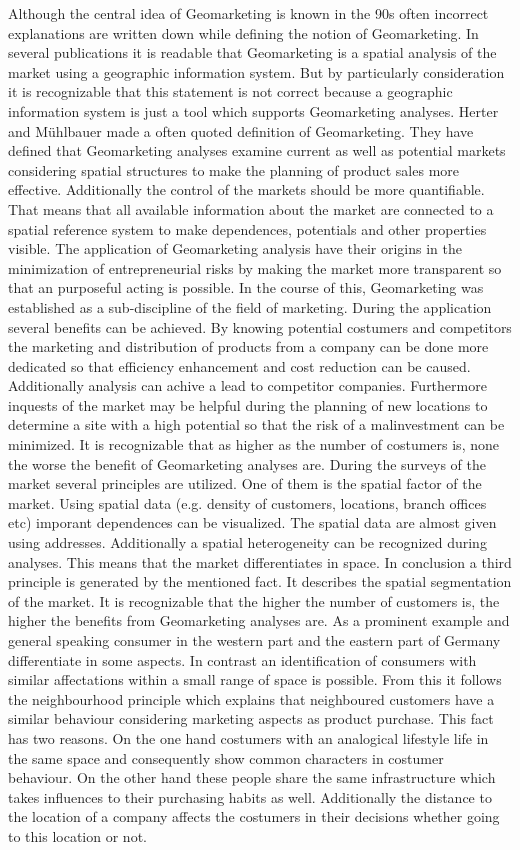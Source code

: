 Although the central idea of Geomarketing is known in the 90s often incorrect explanations are written down while defining the notion of Geomarketing. In several publications it is readable that Geomarketing is a spatial analysis of the market using a geographic information system. But by particularly consideration it is recognizable that this statement is not correct because a geographic information system is just a tool which supports Geomarketing analyses. Herter and Mühlbauer \cite{herter} made a often quoted definition of Geomarketing. They have defined that Geomarketing analyses examine current as well as potential markets considering spatial structures to make the planning of product sales more effective. Additionally the control of the markets should be more quantifiable. That means that all available information about the market are connected to a spatial reference system to make dependences, potentials and other properties visible. The application of Geomarketing analysis have their origins in the minimization of entrepreneurial risks by making the market more transparent so that an purposeful acting is possible. In the course of this, Geomarketing was established as a sub-discipline of the field of marketing. During the application several benefits can be achieved. By knowing potential costumers and competitors the marketing and distribution of products from a company can be done more dedicated so that efficiency enhancement and cost reduction can be caused. Additionally analysis can achive a lead to competitor companies. Furthermore inquests of the market may be helpful during the planning of new locations to determine a site with a high potential so that the risk of a malinvestment can be minimized. It is recognizable that as higher as the number of costumers is, none the worse the benefit of Geomarketing analyses are. During the surveys of the market several principles are utilized. One of them is the spatial factor of the market. Using spatial data (e.g. density of customers, locations, branch offices etc) imporant dependences can be visualized. The spatial data are almost given using addresses. Additionally a spatial heterogeneity can be recognized during analyses. This means that the market differentiates in space. In conclusion a third principle is generated by the mentioned fact. It describes the spatial segmentation of the market. It is recognizable that the higher the number of customers is, the higher the benefits from Geomarketing analyses are. As a prominent example and general speaking consumer in the western part and the eastern part of Germany differentiate in some aspects. In contrast an identification of consumers with similar affectations within a small range of space is possible. From this it follows the neighbourhood principle which explains that neighboured customers have a similar behaviour considering marketing aspects as product purchase. This fact has two reasons. On the one hand costumers with an analogical lifestyle life in the same space and consequently show common characters in costumer behaviour. On the other hand these people share the same infrastructure which takes influences to their purchasing habits as well. Additionally the distance to the location of a company affects the costumers in their decisions whether going to this location or not. 
